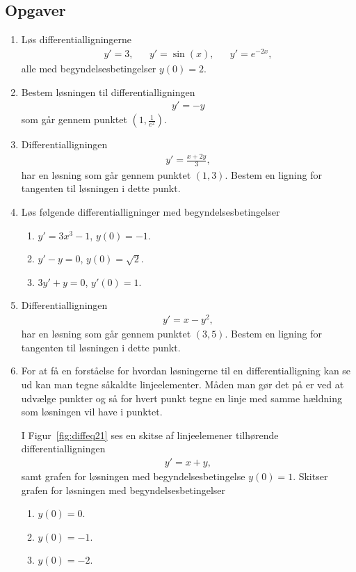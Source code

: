 \subsection{Opgaver}
\begin{enumerate}
	\item Løs differentialligningerne
	\begin{align*}
	y'=3,&&y'=\sin(x),&&y'=e^{-2x},
	\end{align*}
	alle med begyndelsesbetingelser $y(0)=2$.
	
	\item Bestem løsningen til differentialligningen
	\begin{align*}
	y'=-y
	\end{align*}
	som går gennem punktet $(1,\frac{1}{e^2})$. 
	
	\item Differentialligningen
	\begin{align*}
	y'=\frac{x+2y}{3},
	\end{align*}
	har en løsning som går gennem punktet $(1,3)$. Bestem en ligning for tangenten til løsningen i dette punkt.

	\item Løs følgende differentialligninger med begyndelsesbetingelser
\begin{enumerate}
	\item $y'=3x^3-1$, $y(0)=-1$.
	\item $y'-y=0$, $y(0)=\sqrt{2}$.
	\item $3y'+y=0$, $y'(0)=1$.
\end{enumerate}	
	
		\item Differentialligningen
	\begin{align*}
	y'=x-y^2,
	\end{align*}
	har en løsning som går gennem punktet $(3,5)$. Bestem en ligning for tangenten til løsningen i dette punkt.
	
		\item\label{it:diffeq21} For at få en forståelse for hvordan løsningerne til en differentialligning kan se ud kan man tegne såkaldte linjeelementer. Måden man gør det på er ved at udvælge punkter og så for hvert punkt tegne en linje med samme hældning som løsningen vil have i punktet. 
	
	I Figur~\ref{fig:diffeq21} ses en skitse af linjeelemener tilhørende differentialligningen
	\begin{align*}
	y'=x+y,
	\end{align*}
	samt grafen for løsningen med begyndelsesbetingelse $y(0)=1$. Skitser grafen for løsningen med begyndelsesbetingelser
	\begin{enumerate}
		\item $y(0)=0$.
		\item $y(0)=-1$.
		\item $y(0)=-2$.
	\end{enumerate}
	

\end{enumerate}
